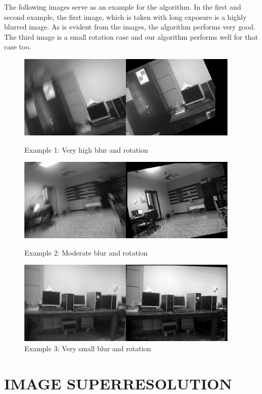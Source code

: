 \documentclass[BTech]{iitmdiss}
\begin{document}
The following images serve as an example for the algorithm. In the first and
second example, the first image, which is taken with long exposure is a highly
blurred image. As is evident from the images, the algorithm performs very good. 
The third image is a small rotation case and our algorithm performs well for
that case too.

\begin{figure}[h]
\begin{center}
\includegraphics[width=300pt]{images/imreg/rotation/eg1/imreg.png}
\caption{Example 1: Very high blur and rotation}
\includegraphics[width=300pt]{images/imreg/rotation/eg2/imreg.png}
\caption{Example 2: Moderate blur and rotation}
\includegraphics[width=300pt]{images/imreg/rotation/eg3/imreg.png}
\caption{Example 3: Very small blur and rotation}
\end{center}
\end{figure}

\pagebreak
\chapter{IMAGE SUPERRESOLUTION}
\label{chap:image_superresolution}
\pagebreak
\end{document}
